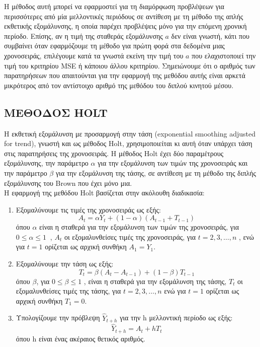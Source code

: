 Η μέθοδος αυτή μπορεί να εφαρμοστεί για τη διαμόρφωση προβλέψεων για
περισσότερες από μία μελλοντικές περιόδους σε αντίθεση με τη μέθοδο της απλής
εκθετικής εξομάλυνσης, η οποία παρέχει προβλέψεις μόνο για την επόμενη χρονική
περίοδο. Επίσης, αν η τιμή της σταθεράς εξομάλυνσης $a$ δεν είναι γνωστή, κάτι που
συμβαίνει όταν εφαρμόζουμε τη μέθοδο για πρώτη φορά στα δεδομένα μιας
χρονοσειράς, επιλέγουμε κατά τα γνωστά εκείνη την τιμή του $a$ που ελαχιστοποιεί
την τιμή του κριτηρίου MSE ή κάποιου άλλου κριτηρίου. Σημειώνουμε ότι ο αριθμός
των παρατηρήσεων που απαιτούνται για την εφαρμογή της μεθόδου αυτής είναι αρκετά μικρότερος από τον αντίστοιχο αριθμό της μεθόδου του διπλού κινητού
μέσου.

\subsection{ ΜΕΘΟΔΟΣ HOLT}
Η εκθετική εξομάλυνση με προσαρμογή στην τάση (exponential smoothing
adjusted for trend), γνωστή και ως μέθοδος Holt, χρησιμοποιείται κι αυτή όταν
υπάρχει τάση στις παρατηρήσεις της χρονοσειράς. Η μέθοδος Holt έχει δύο
παραμέτρους εξομάλυνσης, την παράμετρο $\alpha $ για την εξομάλυνση των τιμών της
χρονοσειράς και την παράμετρο $\beta $ για την εξομάλυνση της τάσης, σε αντίθεση με τη
μέθοδο της διπλής εξομάλυνσης του Brown που έχει μόνο μια.\\

Η εφαρμογή της μεθόδου Holt βασίζεται στην ακόλουθη διαδικασία:\\
\begin{enumerate}
\item Εξομαλύνουμε τις τιμές της χρονοσειράς ως εξής:\\
$$ A_t=\alpha Y_t + \left(1-\alpha\right) \left(A_{t-1}+T_{t-1}\right) $$ 
όπου $\alpha$ είναι η σταθερά για την εξομάλυνση των τιμών της χρονοσειράς, για
$0 \leq \alpha \leq 1\:$ , $A_t$ οι εξομαλυνθείσες τιμές της χρονοσειράς, για $t = 2,3,\ldots,n$ , ενώ για $t=1$
ορίζεται ως αρχική συνθήκη $ A_1 = Y_1$.

\item Εξομαλύνουμε την τάση ως εξής:\\
$$T_t=\beta \left(A_t -A_{t-1}\right)+\left(1-\beta\right)T_{t-1} $$
όπου $\beta$, για $0 \leq \beta \leq 1$ , είναι η σταθερά για την εξομάλυνση της τάσης, $T_t$ οι
εξομαλυνθείσες τιμές της τάσης, για $t=2,3,\ldots,n$ ενώ για $t=1$ ορίζεται ως αρχική
συνθήκη $T_1 =0$.

\item Υπολογίζουμε την πρόβλεψη $ \widehat{Y}_{t+h} $ για την h μελλοντική περίοδο ως εξής:\\
$$\widehat{Y}_{t+h}=A_t+hT_t $$
όπου h είναι ένας ακέραιος θετικός αριθμός.\\
\end{enumerate}

